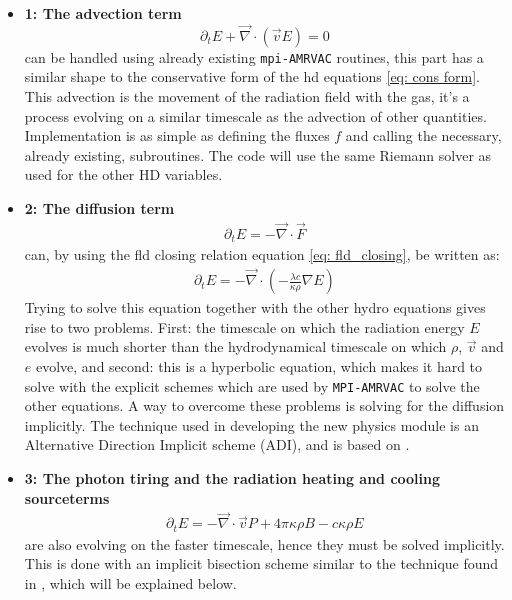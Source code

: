\begin{itemize}
\item \textbf{1: The advection term}
\begin{equation}
\partial_t E + \vec{\nabla} \cdot \left( \vec{v} E \right) = 0
\end{equation}
can be handled using already existing \texttt{mpi-AMRVAC} routines, this part has a similar shape to the conservative form of the hd equations \eqref{eq: cons form}. This advection is the movement of the radiation field with the gas, it's a process evolving on a similar timescale as the advection of other quantities. Implementation is as simple as defining the fluxes $f$ and calling the necessary, already existing, subroutines. The code will use the same Riemann solver as used for the other HD variables.\\

\item \textbf{2: The diffusion term}
\begin{align}
\partial_t E = - \vec{\nabla} \cdot \vec{F}
\end{align}
can, by using the fld closing relation equation \ref{eq: fld_closing}, be written as:
\begin{align}
\partial_t E = - \vec{\nabla} \cdot \left( -\frac{\lambda c}{\kappa \rho} \nabla E\right)
\end{align}
Trying to solve this equation together with the other hydro equations gives rise to two problems. First: the timescale on which the radiation energy $E$ evolves is much shorter than the hydrodynamical timescale on which $\rho$, $\vec{v}$ and $e$ evolve, and second: this is a hyperbolic equation, which makes it hard to solve with the explicit schemes which are used by \texttt{MPI-AMRVAC} to solve the other equations. A way to overcome these problems is solving for the diffusion implicitly. The technique used in developing the new physics module is an Alternative Direction Implicit scheme (ADI), and is based on \citep{Turner12001}.\\

\item \textbf{3: The photon tiring and the radiation heating and cooling sourceterms}
\begin{align}
\partial_t E = - \vec{\nabla} \cdot \vec{v} P + 4\pi \kappa\rho B - c \kappa \rho E
\end{align}
are also evolving on the faster timescale, hence they must be solved implicitly. This is done with an implicit bisection scheme similar to the technique found in \citep{Turner12001}, which will be explained below.
\end{itemize}

